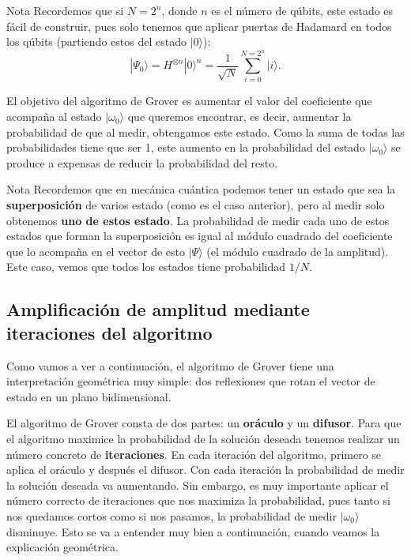 \documentclass[a4paper,11pt]{book} %
\numberwithin{equation}{chapter}
\begin{document}
\begin{mybox_blue}{Nota}
Recordemos que si $N=2^n$, donde $n$ es el número de qúbits, este estado es fácil de construir, pues solo tenemos que aplicar puertas de Hadamard en todos los qúbits (partiendo estos del estado $|0 \rangle$):
\begin{equation} \label{ec_geo_phi_0_H}
|\Psi_0 \rangle = H^{\otimes n} |0 \rangle^{n} = \frac{1}{\sqrt{N}}  \sum_{i=0}^{N=2^n} | i \rangle.
\end{equation}
\end{mybox_blue}

El objetivo del algoritmo de Grover es aumentar el valor del coeficiente que acompaña al estado $| \omega_0 \rangle$ que queremos encontrar, es decir, aumentar la probabilidad de que al medir, obtengamos este estado. Como la suma de todas las probabilidades tiene que ser 1, este aumento en la probabilidad del estado $| \omega_0 \rangle$ se produce a expensas de reducir la probabilidad del resto. 

	\begin{mybox_blue}{Nota}
	Recordemos que en mecánica cuántica podemos tener un estado que sea la \textbf{superposición} 
	de varios estado (como es el caso anterior), pero al medir solo obtenemos \textbf{uno de estos 
	estado}. La probabilidad de medir cada uno de estos estados que forman la superposición es igual 
	al módulo cuadrado del coeficiente que lo acompaña en el vector de esto $| \Psi \rangle$ (el módulo 
	cuadrado de la amplitud). Este caso, vemos que todos los estados tiene probabilidad $1/N$. 
	\end{mybox_blue}

\subsection{Amplificación de amplitud mediante iteraciones del algoritmo}

Como vamos a ver a continuación, el algoritmo de Grover tiene una interpretación geométrica muy simple: dos reflexiones que rotan el vector de estado en un plano bidimensional. 

El algoritmo de Grover consta de dos partes: un \textbf{oráculo} y un \textbf{difusor}. Para que el algoritmo maximice la probabilidad de la solución deseada tenemos realizar un número concreto de \textbf{iteraciones}. En cada iteración del algoritmo, primero se aplica el oráculo y después el difusor. Con cada iteración la probabilidad de medir la solución deseada va aumentando. Sin embargo, es muy importante aplicar el número correcto de iteraciones que nos maximiza la probabilidad, pues tanto si nos quedamos cortos como si nos pasamos, la probabilidad de medir $|\omega_0 \rangle$ disminuye. Esto se va a entender muy bien a continuación, cuando veamos la explicación geométrica. 
\end{document}
